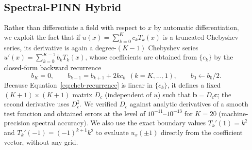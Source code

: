 \documentclass[symmetry,article,submit,moreauthors]{Definitions/mdpi}
\begin{document}
\subsection{Spectral-PINN Hybrid}

Rather than differentiate a field with respect to $x$ by automatic differentiation, we exploit the fact that if $u(x)=\sum_{k=0}^{K}c_kT_k(x)$ is a truncated Chebyshev series, its derivative is again a degree-$(K-1)$ Chebyshev series $u'(x)=\sum_{k=0}^{K-1}b_kT_k(x)$, whose coefficients are obtained from $\{c_k\}$ by the closed-form backward recurrence
\begin{equation}\label{eq:cheb-recurrence}
b_K=0,\qquad b_{k-1}=b_{k+1}+2kc_k\ \ (k=K,\dots,1),\qquad b_0\leftarrow b_0/2.
\end{equation}
Because Equation~\eqref{eq:cheb-recurrence} is linear in $\{c_k\}$, it defines a fixed $(K+1)\times(K+1)$ matrix $D_c$ (independent of $u$) such that $\mathbf{b}=D_c\mathbf{c}$; the second derivative uses $D_c^2$. We verified $D_c$ against analytic derivatives of a smooth test function and obtained errors at the level of $10^{-11}$--$10^{-13}$ for $K=20$ (machine-precision spectral accuracy). We also use the exact boundary values $T_k'(1)=k^2$ and $T_k'(-1)=(-1)^{k+1}k^2$ to evaluate $u_x(\pm1)$ directly from the coefficient vector, without any grid.\label{sec:cheb-coeff}
\end{document}
